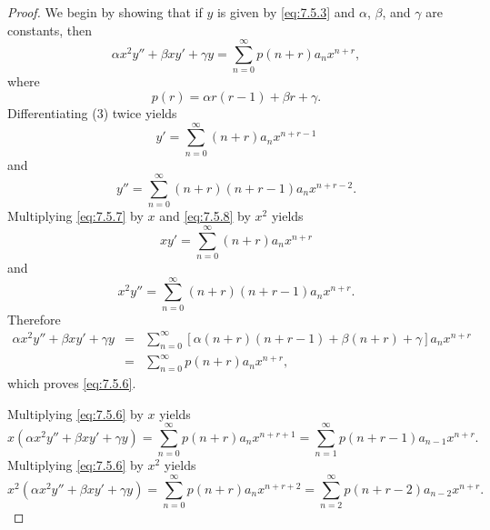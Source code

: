 \documentclass{ximera}
\begin{document}
\begin{proof}
We begin by showing that if $y$ is given by \eqref{eq:7.5.3} and
$\alpha$, $\beta$, and $\gamma$ are constants, then
\begin{equation} \label{eq:7.5.6}
\alpha x^2y''+\beta xy'+\gamma y=
\sum_{n=0}^\infty p(n+r)a_nx^{n+r},
\end{equation}
where
$$
p(r)=\alpha r(r-1)+\beta r +\gamma.
$$
Differentiating (3)  twice yields
\begin{equation} \label{eq:7.5.7}
y'=\sum_{n=0}^\infty (n+r)a_nx^{n+r-1}
\end{equation}
and
\begin{equation} \label{eq:7.5.8}
y''=\sum_{n=0}^\infty (n+r)(n+r-1)a_nx^{n+r-2}.
\end{equation}
Multiplying \eqref{eq:7.5.7} by $x$ and \eqref{eq:7.5.8} by $x^2$ yields
$$
xy'=\sum_{n=0}^\infty (n+r)a_nx^{n+r}
$$
and
$$
x^2y''=\sum_{n=0}^\infty (n+r)(n+r-1)a_nx^{n+r}.
$$
Therefore
\begin{eqnarray*}
\alpha x^2y''+\beta xy'+\gamma y
&=&\sum_{n=0}^\infty\left[\alpha(n+r)(n+r-1)+\beta(n+r)+\gamma\right]a_n
x^{n+r}\\
&=&\sum_{n=0}^\infty p(n+r)a_nx^{n+r},
\end{eqnarray*}
which proves  \eqref{eq:7.5.6}.

 Multiplying \eqref{eq:7.5.6} by $x$ yields
\begin{equation} \label{eq:7.5.9}
x(\alpha x^2y''+\beta xy'+\gamma
y)=\sum_{n=0}^\infty p(n+r) a_nx^{n+r+1}=
\sum_{n=1}^\infty p(n+r-1)a_{n-1}x^{n+r}.
\end{equation}
Multiplying \eqref{eq:7.5.6} by $x^2$ yields
\begin{equation} \label{eq:7.5.10}
x^2(\alpha x^2y''+\beta xy'+\gamma
y)=\sum_{n=0}^\infty p(n+r)a_nx^{n+r+2}=
\sum_{n=2}^\infty p(n+r-2)a_{n-2}x^{n+r}.
\end{equation}


\end{proof}
\end{document}
